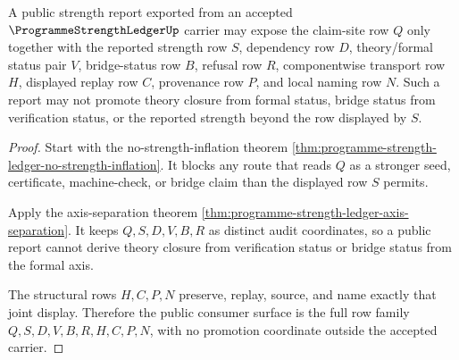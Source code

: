 \begin{theorem}
\label{thm:programmestrengthledger-public-report-interface}
A public strength report exported from an accepted $\ProgrammeStrengthLedgerUp$
carrier may expose the claim-site row $Q$ only together with the reported
strength row $S$, dependency row $D$, theory/formal status pair $V$,
bridge-status row $B$, refusal row $R$, componentwise transport row $H$,
displayed replay row $C$, provenance row $P$, and local naming row $N$. Such a
report may not promote theory closure from formal status, bridge status from
verification status, or the reported strength beyond the row displayed by $S$.
\end{theorem}
\begin{proof}
Start with the no-strength-inflation theorem
\autoref{thm:programme-strength-ledger-no-strength-inflation}. It blocks any
route that reads $Q$ as a stronger seed, certificate, machine-check, or bridge
claim than the displayed row $S$ permits.

Apply the axis-separation theorem
\autoref{thm:programme-strength-ledger-axis-separation}. It keeps $Q,S,D,V,B,R$
as distinct audit coordinates, so a public report cannot derive theory closure
from verification status or bridge status from the formal axis.

The structural rows $H,C,P,N$ preserve, replay, source, and name exactly that
joint display. Therefore the public consumer surface is the full row family
$Q,S,D,V,B,R,H,C,P,N$, with no promotion coordinate outside the accepted
carrier.
\end{proof}

